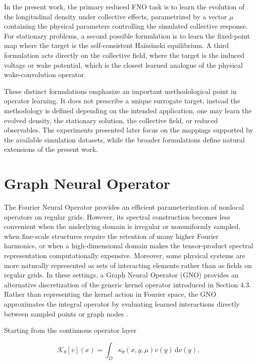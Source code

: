 In the present work, the primary reduced FNO task is to learn the evolution of the longitudinal density under collective effects, parametrized by a vector \(\mu\) containing the physical parameters controlling the simulated collective response. For stationary problems, a second possible formulation is to learn the fixed-point map where the target is the self-consistent Haïssinski equilibrium. A third formulation acts directly on the collective field, where the target is the induced voltage or wake potential, which is the closest learned analogue of the physical wake-convolution operator.

These distinct formulations emphasize an important methodological point in operator learning. It does not prescribe a unique surrogate target, instead the methodology is defined depending on the intended application, one may learn the evolved density, the stationary solution, the collective field, or reduced observables. The experiments presented later focus on the mappings supported by the available simulation datasets, while the broader formulations define natural extensions of the present work.

\section{Graph Neural Operator}
\label{sec:04_machine_learning_methodology_graph_neural_operator}

The Fourier Neural Operator provides an efficient parameterization of nonlocal operators on regular grids. However, its spectral construction becomes less convenient when the underlying domain is irregular or nonuniformly sampled, when fine-scale structures require the retention of many higher Fourier harmonics, or when a high-dimensional domain makes the tensor-product spectral representation computationally expensive. Moreover, some physical systems are more naturally represented as sets of interacting elements rather than as fields on regular grids. In these settings, a Graph Neural Operator (GNO) provides an alternative discretization of the generic kernel operator introduced in Section 4.3. Rather than representing the kernel action in Fourier space, the GNO approximates the integral operator by evaluating learned interactions directly between sampled points or graph nodes \cite{li2020graph,kovachki2023operators}.

Starting from the continuous operator layer

\begin{equation}
\label{eq:103}
\mathcal K_{\theta}[v](x)=\int_D\kappa_{\theta}(x,y,\mu)v(y)\,\mathrm d\nu(y),
\end{equation}

